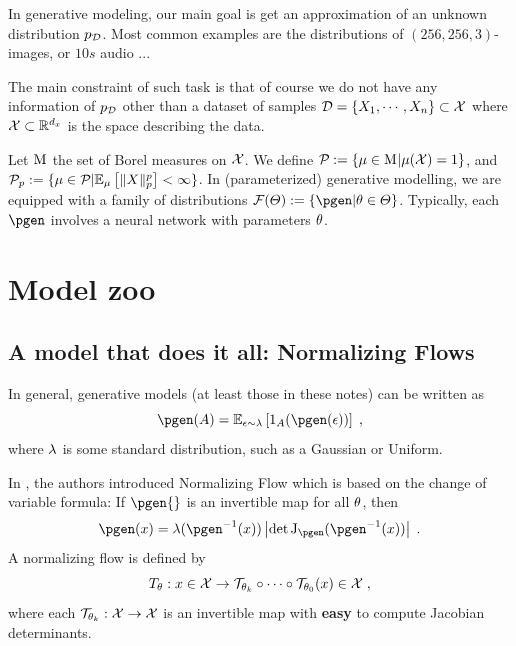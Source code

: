 

In generative modeling, our main goal is get an approximation of an unknown distribution
$p_{\mathcal{D}}$. Most common examples are the distributions of $(256, 256, 3)$-images, or $10s$ audio ...

The main constraint of such task is that of course we do not have any information of $p_{\mathcal{D}}$ other than a dataset of samples $\mathcal{D}=\{X_1, \cdots, X_n\} \subset \mathcal{X}$ where
$\mathcal{X} \subset \mathbb{R}^{d_x}$ is the space describing the data.


Let $\mathrm{M}_{}$ the set of Borel measures on $\mathcal{X}$.
We define $\mathcal{P}_{} := \{\mu \in \mathrm{M}_{} | \mu(\mathcal{X}) = 1\}$, and $\mathcal{P}_{p} := \{\mu \in \mathcal{P}_{}| \mathbb{E}_{\mu}\left[\|X\|_p^p\right] < \infty\}$.
In (parameterized) generative modelling, we are equipped with a family of distributions $\vfam{\paramset} \eqdef \{\pgen | \param \in \paramset\}$. Typically, each $\pgen$ involves a neural network with parameters $\theta$.

\section{Model zoo}

\subsection{A model that does it all: Normalizing Flows}
\label{sec:gen:nf}

In general, generative models (at least those in these notes) can be written as 
\[
    \pgen(A) = \PE{\epsilon \sim \gendist}{\indi{A}(\pgen(\epsilon))} \eqsp,
\]
where $\lambda$ is some standard distribution, such as a Gaussian or Uniform.

In \cite{rezende2015variational}, the authors introduced Normalizing Flow which is based on the change of variable formula:
If $\pgen{}$ is an invertible map for all $\theta$, then
\begin{equation}
    \pgen(\lstate) = \gendist(\pgen^{-1}(\lstate))\left|\det \jac{\pgen}(\pgen^{-1}(\lstate))\right| \eqsp.
\end{equation}
A normalizing flow is defined by
\begin{equation}
    \label{eq:nflow_def}
    T_{\theta}: x \in \mathcal{X} \rightarrow \mathcal{T}_{\theta_k}\circ \cdots \circ \mathcal{T}_{\theta_0}(x) \in \mathcal{X} \;,
\end{equation}
where each $\mathcal{T}_{\theta_k}: \mathcal{X} \rightarrow \mathcal{X}$ is an invertible map with \textbf{easy} to compute Jacobian determinants. 

